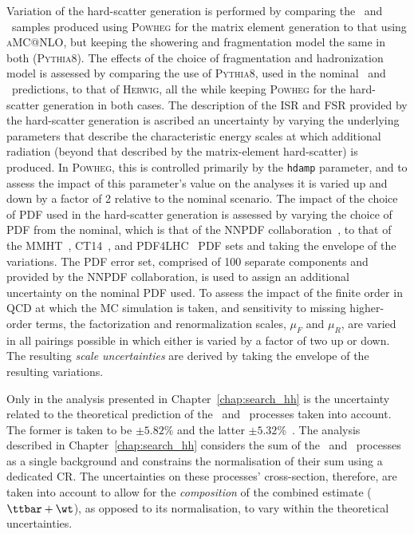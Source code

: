 Variation of the hard-scatter generation is performed by comparing the \ttbar~and \wt~samples produced
using \textsc{Powheg} for the matrix element generation to that using \textsc{aMC@NLO}, but keeping
the showering and fragmentation model the same in both (\textsc{Pythia8}).
The effects of the choice of fragmentation and hadronization model is assessed by comparing
the use of \textsc{Pythia8}, used in the nominal \ttbar~and \wt~predictions, to that of \textsc{Herwig}, all the while
keeping \textsc{Powheg} for the hard-scatter generation in both cases.
The description of the ISR and FSR provided by the hard-scatter generation is ascribed an
uncertainty by varying the underlying parameters that describe the characteristic energy
scales at which additional radiation (beyond that described by the matrix-element hard-scatter)
is produced.
In \textsc{Powheg}, this is controlled primarily by the \texttt{hdamp} parameter, and to assess
the impact of this parameter's value on the analyses it is varied up and down by a factor of 2 relative
to the nominal scenario.
The impact of the choice of PDF used in the hard-scatter generation is assessed by varying the
choice of PDF from the nominal, which is that of the NNPDF collaboration~\cite{Ball:2014uwa},
to that of the MMHT~\cite{Harland-Lang:2014zoa}, CT14~\cite{Lai:2010vv}, and PDF4LHC~\cite{Butterworth:2015oua} PDF sets and taking
the envelope of the variations.
The PDF error set, comprised of 100 separate components and provided by the NNPDF collaboration, is used to assign an additional uncertainty
on the nominal PDF used.
To assess the impact of the finite order in QCD at which the MC simulation is taken, and
sensitivity to missing higher-order terms, the factorization and renormalization scales,
$\mu_F$ and $\mu_R$, are varied in all pairings possible in which either is varied by a factor of two
up or down.
The resulting \textit{scale uncertainties} are derived by taking the envelope of the resulting variations.

Only in the analysis presented in Chapter~\ref{chap:search_hh} is the uncertainty related
to the theoretical prediction of the \ttbar~and \wt~processes taken into account.
The former is taken to be $\pm 5.82\%$ and the latter $\pm 5.32$\%~\cite{Czakon:2013goa,ATLAS-CONF-2013-102,Kidonakis:2010ux}.
The analysis described in Chapter~\ref{chap:search_hh} considers the sum of the \ttbar~and \wt~processes
as a single background and constrains the normalisation of their sum using a dedicated CR.
The uncertainties on these processes' cross-section, therefore, are taken into account to allow
for the \textit{composition} of the combined estimate ($\ttbar+\wt$), as opposed to its normalisation, to vary within the theoretical uncertainties.

